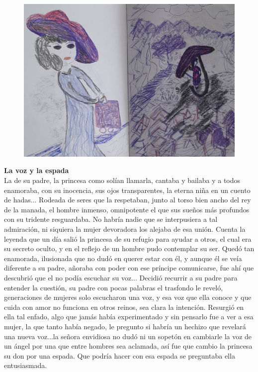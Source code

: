 \documentclass[12pt, a4paper, twoside]{book} %
\begin{document}
\clearpage

\begin{figure}[H]
	\centering
	\includegraphics[width=\textwidth]{./images/1f81324df23788.jpg}
\end{figure}

\clearpage

\noindent\textbf{La voz y la espada}\\
La de su padre, la princesa como solían llamarla, cantaba y bailaba y a todos enamoraba, con su inocencia, sus ojos transparentes, la eterna niña en un cuento de hadas...
Rodeada de seres que la respetaban, junto al torso bien ancho del rey de la manada, el hombre inmenso, omnipotente el que sus sueños más profundos con su tridente resguardaba.
No habría nadie que se interpusiera a tal admiración, ni siquiera la mujer devoradora los alejaba de esa unión.
Cuenta la leyenda que un día salió la princesa de su refugio para ayudar a otros, el cual era su secreto oculto, y en el reflejo de un hombre pudo contemplar su ser.
Quedó tan enamorada, ilusionada que no dudó en querer estar con él, y aunque él se veía diferente a su padre, añoraba con poder con ese príncipe comunicarse, fue ahí que descubrió que el no podía escuchar su voz...
Decidió recurrir a su padre para entender la cuestión, su padre con pocas palabras el trasfondo le reveló, generaciones de mujeres solo escucharon una voz, y esa voz que ella conoce y que cuida con amor no funciona en otros reinos, sea clara la intención. Resurgió en ella tal enfado, algo que jamás había experimentado y sin pensarlo fue a ver a esa mujer, la que tanto había negado, le pregunto si habría un hechizo que revelará una nueva voz...la señora envidiosa no dudó ni un sopetón en cambiarle la voz de un ángel por una que entre hombres sea aclamada, así  fue que cambio la princesa su don por una espada.
Que podría hacer con esa espada se preguntaba ella entusiasmada.
\end{document}
